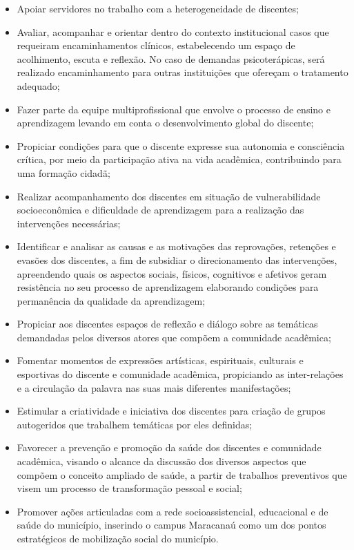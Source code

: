 \documentclass{paper}
\begin{document}
\begin{itemize}
\item Apoiar servidores no trabalho com a heterogeneidade de discentes;
\item Avaliar, acompanhar e orientar dentro do contexto institucional casos que requeiram encaminhamentos clínicos, estabelecendo um espaço de acolhimento, escuta e reflexão. No caso de demandas psicoterápicas, será realizado encaminhamento para outras instituições que ofereçam o tratamento adequado;
\item Fazer parte da equipe multiprofissional que envolve o processo de ensino e aprendizagem levando em conta o desenvolvimento global do discente;
\item Propiciar condições para que o discente expresse sua autonomia e consciência crítica, por meio da participação ativa na vida acadêmica, contribuindo para uma formação cidadã; 
\item Realizar acompanhamento dos discentes em situação de vulnerabilidade socioeconômica e dificuldade de aprendizagem para a realização das intervenções necessárias;
\item Identificar e analisar as causas e as motivações das reprovações, retenções e evasões dos discentes, a fim de subsidiar o direcionamento das intervenções, apreendendo quais os aspectos sociais, físicos, cognitivos e afetivos geram resistência no seu processo de aprendizagem elaborando condições para permanência da qualidade da aprendizagem;
\item Propiciar aos discentes espaços de reflexão e diálogo sobre as temáticas demandadas pelos diversos atores que compõem a comunidade acadêmica; 
\item Fomentar momentos de expressões artísticas, espirituais, culturais e esportivas do discente e comunidade acadêmica, propiciando as inter-relações e a circulação da palavra nas suas mais diferentes manifestações;
\item Estimular a criatividade e iniciativa dos discentes para criação de grupos autogeridos que trabalhem temáticas por eles definidas;
\item Favorecer a prevenção e promoção da saúde dos discentes e comunidade acadêmica, visando o alcance da discussão dos diversos aspectos que compõem o conceito ampliado de saúde, a partir de trabalhos preventivos que visem um processo de transformação pessoal e social;
\item Promover ações articuladas com a rede socioassistencial, educacional e de saúde do município, inserindo o campus Maracanaú como um dos pontos estratégicos de mobilização social do município.
\end{itemize}
\end{document}
